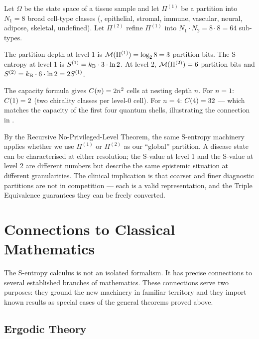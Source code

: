 \begin{example}
\label{ex:cellular-partition}
Let $\Omega$ be the state space of a tissue sample and let $\Pi^{(1)}$ be
a partition into $N_1 = 8$ broad cell-type classes (\eg, epithelial, stromal,
immune, vascular, neural, adipose, skeletal, undefined).  Let $\Pi^{(2)}$
refine $\Pi^{(1)}$ into $N_1 \cdot N_2 = 8 \cdot 8 = 64$ sub-types.

The partition depth at level 1 is $\mathcal{M}(\Pi^{(1)}) = \log_2 8 = 3$
partition bits.  The S-entropy at level 1 is
$S^{(1)} = k_{\mathrm{B}} \cdot 3 \cdot \ln 2$.  At level 2, $\mathcal{M}(\Pi^{(2)}) = 6$
partition bits and $S^{(2)} = k_{\mathrm{B}} \cdot 6 \cdot \ln 2 = 2 S^{(1)}$.

The capacity formula gives $C(n) = 2n^2$ cells at nesting depth
$n$.  For $n = 1$: $C(1) = 2$ (two chirality classes per level-0
cell).  For $n = 4$: $C(4) = 32$ — which matches the capacity of
the first four quantum shells, illustrating the connection in
.

By the Recursive No-Privileged-Level Theorem, the same S-entropy machinery
applies whether we use $\Pi^{(1)}$ or $\Pi^{(2)}$ as our ``global''
partition.  A disease state can be characterised at either resolution; the
S-value at level 1 and the S-value at level 2 are different numbers but
describe the same epistemic situation at different granularities.  The
clinical implication is that coarser and finer diagnostic partitions are
not in competition — each is a valid representation, and the Triple
Equivalence guarantees they can be freely converted.
\end{example}

\section{Connections to Classical Mathematics}
\label{sec:classical-connections}

The S-entropy calculus is not an isolated formalism.  It has precise
connections to several established branches of mathematics.  These
connections serve two purposes: they ground the new machinery in familiar
territory and they import known results as special cases of the general
theorems proved above.

\subsection{Ergodic Theory}
\label{subsec:ergodic}

